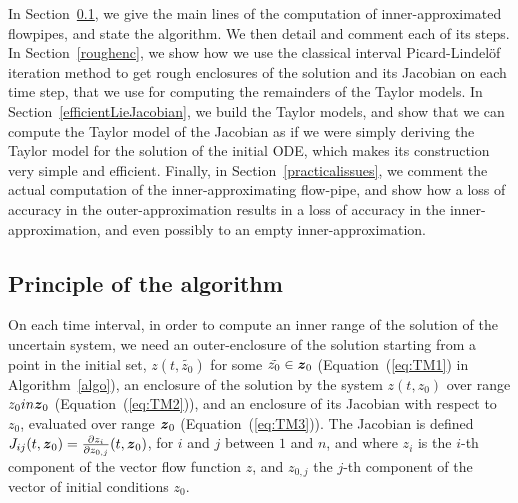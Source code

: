 \documentclass{sig-alternate-05-2015}
\begin{document}
In Section~\ref{principle}, we give the main lines of the computation of inner-approximated flowpipes, 
and state the algorithm. We then detail and comment each of its steps. In Section~\ref{roughenc}, we
show how we use the classical interval Picard-Lindel\"of iteration method to get rough
enclosures of the solution and its Jacobian  on each time step, that we use for computing the remainders of the Taylor models.
In Section~\ref{efficientLieJacobian}, we build the Taylor models, and show that  we can compute
the Taylor model of the Jacobian as if we were simply deriving the Taylor model for the solution of the initial ODE, 
which makes its construction very simple and efficient. Finally, in Section~\ref{practicalissues}, we comment the actual 
computation of the inner-approximating flow-pipe, and show how a loss of accuracy in the outer-approximation results in 
a loss of accuracy in the inner-approximation, and even possibly to an empty inner-approximation.





\subsection{Principle of the algorithm}

\label{principle}

On each time interval, in order to compute an inner range of the solution of the uncertain system, we  need an outer-enclosure of the solution 
starting from a point in the initial set, 
$z(t,\tilde{z_0})$ for some $\tilde{z_0} \in \z_0$ (Equation~(\ref{eq:TM1}) in Algorithm~\ref{algo}), 
an enclosure of the solution by the system $z(t,z_0)$ over range $z_0 in \z_0$ (Equation~(\ref{eq:TM2})), 
and an enclosure of its Jacobian with respect to $z_0$, evaluated over range $\z_0$ (Equation~(\ref{eq:TM3})). 
The Jacobian is
defined $J_{ij}(t,\z_0)=\frac{\partial z_i}{\partial z_{0,j}}(t,\z_0)$, for $i$ and $j$ between $1$ and $n$, and where $z_i$ is the $i$-th 
component of the vector flow function $z$, and $z_{0,j}$ the $j$-th component of the vector of initial conditions $z_0$. 
\end{document}
